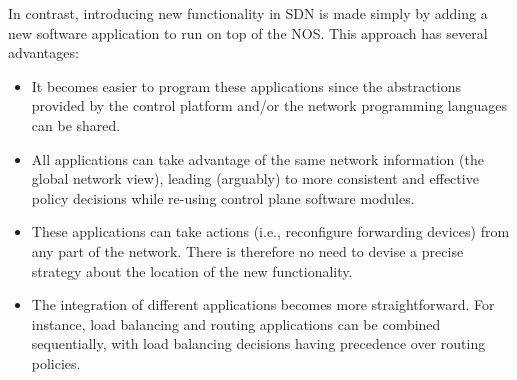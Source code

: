 In contrast, introducing new functionality in SDN is made simply by adding a new software 
application to run on top of the NOS. This approach has several advantages:
\begin{itemize}
\item It becomes easier to program these applications since the abstractions provided by the 
control platform and/or the network programming languages can be shared.
\item All applications can take advantage of the same network information (the global network view), 
leading (arguably) to more consistent and effective policy decisions while re-using control plane 
software modules.
\item These applications can take actions (i.e., reconfigure forwarding devices) from any part of 
the network. There is therefore no need to devise a precise strategy about the location of the new 
functionality.
\item The integration of different applications becomes more straightforward. For instance, load 
balancing and routing applications can be combined sequentially, with load balancing decisions having 
precedence over routing policies.
\end{itemize}
%

